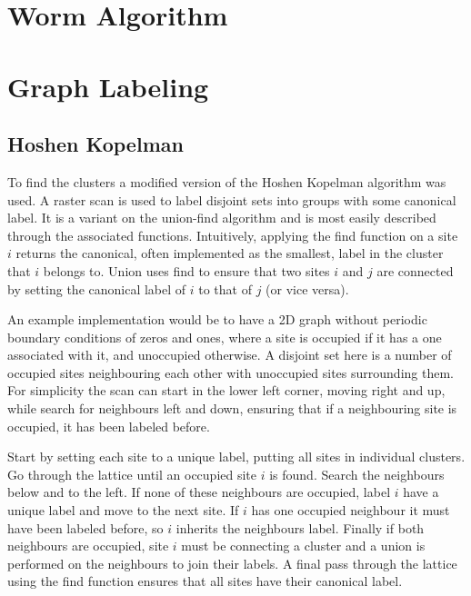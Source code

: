 \section{Worm Algorithm}
\label{sec:WormAlgorithm}


\section{Graph Labeling}
\label{sec:GraphLabeling}

\subsection{Hoshen Kopelman}
\label{subsec:HoshenKopelman}

To find the clusters a modified version of the Hoshen Kopelman algorithm was used. A raster scan is used to label disjoint sets into groups with some canonical label\cite{Hoshen:HKAlgo}. It is a variant on the union-find algorithm and is most easily described through the associated functions. Intuitively, applying the find function on a site $i$ returns the canonical, often implemented as the smallest, label in the cluster that $i$ belongs to. Union uses find to ensure that two sites $i$ and $j$ are connected by setting the canonical label of $i$ to that of $j$ (or vice versa). 

An example implementation would be to have a 2D graph without periodic boundary conditions of zeros and ones, where a site is occupied if it has a one associated with it, and unoccupied otherwise. A disjoint set here is a number of occupied sites neighbouring each other with unoccupied sites surrounding them. For simplicity the scan can start in the lower left corner, moving right and up, while search for neighbours left and down, ensuring that if a neighbouring site is occupied, it has been labeled before. 

Start by setting each site to a unique label, putting all sites in individual clusters. Go through the lattice until an occupied site $i$ is found. Search the neighbours below and to the left. If none of these neighbours are occupied, label $i$ have a unique label and move to the next site. If $i$ has one occupied neighbour it must have been labeled before, so $i$ inherits the neighbours label. Finally if both neighbours are occupied, site $i$ must be connecting a cluster and a union is performed on the neighbours to join their labels. A final pass through the lattice using the find function ensures that all sites have their canonical label.

